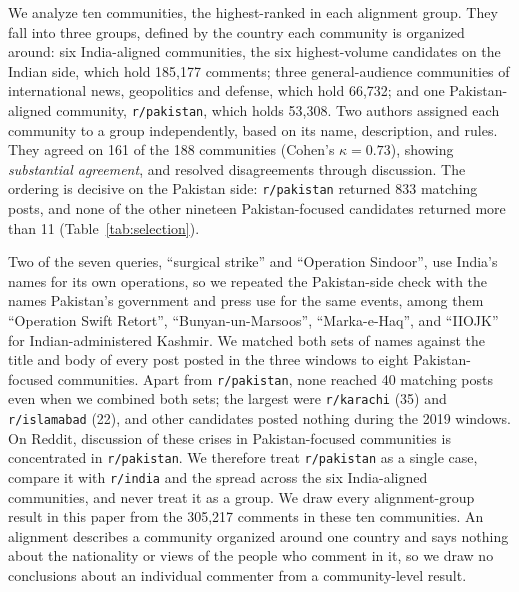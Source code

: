 

We analyze ten communities, the highest-ranked in each alignment group. They fall into three groups, defined by the country each community is organized around: six India-aligned communities, the six highest-volume candidates on the Indian side, which hold 185,177 comments; three general-audience communities of international news, geopolitics and defense, which hold 66,732; and one Pakistan-aligned community, \texttt{r/pakistan}, which holds 53,308. Two authors assigned each community to a group independently, based on its name, description, and rules. They agreed on 161 of the 188 communities (Cohen's $\kappa = 0.73$), showing \textit{substantial agreement}, and resolved disagreements through discussion. The ordering is decisive on the Pakistan side: \texttt{r/pakistan} returned 833 matching posts, and none of the other nineteen Pakistan-focused candidates returned more than 11 (Table~\ref{tab:selection}).


Two of the seven queries, ``surgical strike'' and ``Operation Sindoor'', use India's names for its own operations, so we repeated the Pakistan-side check with the names Pakistan's government and press use for the same events, among them ``Operation Swift Retort'', ``Bunyan-un-Marsoos'', ``Marka-e-Haq'', and ``IIOJK'' for Indian-administered Kashmir. We matched both sets of names against the title and body of every post posted in the three windows to eight Pakistan-focused communities. Apart from \texttt{r/pakistan}, none reached 40 matching posts even when we combined both sets; the largest were \texttt{r/karachi} (35) and \texttt{r/islamabad} (22), and other candidates posted nothing during the 2019 windows. On Reddit, discussion of these crises in Pakistan-focused communities is concentrated in \texttt{r/pakistan}. We therefore treat \texttt{r/pakistan} as a single case, compare it with \texttt{r/india} and the spread across the six India-aligned communities, and never treat it as a group. We draw every alignment-group result in this paper from the 305,217 comments in these ten communities. An alignment describes a community organized around one country and says nothing about the nationality or views of the people who comment in it, so we draw no conclusions about an individual commenter from a community-level result.




